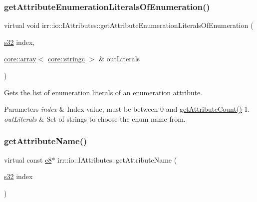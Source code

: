 \subsubsection{\texorpdfstring{get\+Attribute\+Enumeration\+Literals\+Of\+Enumeration()}{getAttributeEnumerationLiteralsOfEnumeration()}\hspace{0.1cm}{\footnotesize\ttfamily [2/2]}}
{\footnotesize\ttfamily virtual void irr\+::io\+::\+I\+Attributes\+::get\+Attribute\+Enumeration\+Literals\+Of\+Enumeration (\begin{DoxyParamCaption}\item[{\hyperlink{namespaceirr_ac66849b7a6ed16e30ebede579f9b47c6}{s32}}]{index,  }\item[{\hyperlink{classirr_1_1core_1_1array}{core\+::array}$<$ \hyperlink{namespaceirr_1_1core_ade1071a878633f2f6d8a75c5d11fec19}{core\+::stringc} $>$ \&}]{out\+Literals }\end{DoxyParamCaption})\hspace{0.3cm}{\ttfamily [pure virtual]}}



Gets the list of enumeration literals of an enumeration attribute. 


\begin{DoxyParams}{Parameters}
{\em index} & Index value, must be between 0 and \hyperlink{classirr_1_1io_1_1IAttributes_a796bdd9440ee7ba0b6742a90a82870b6}{get\+Attribute\+Count()}-\/1. \\
\hline
{\em out\+Literals} & Set of strings to choose the enum name from. \\
\hline
\end{DoxyParams}
\mbox{\label{classirr_1_1io_1_1IAttributes_adee33f518d95a1ca17146bb055c6e5f3}} 
\subsubsection{\texorpdfstring{get\+Attribute\+Name()}{getAttributeName()}}
{\footnotesize\ttfamily virtual const \hyperlink{namespaceirr_a9395eaea339bcb546b319e9c96bf7410}{c8}$\ast$ irr\+::io\+::\+I\+Attributes\+::get\+Attribute\+Name (\begin{DoxyParamCaption}\item[{\hyperlink{namespaceirr_ac66849b7a6ed16e30ebede579f9b47c6}{s32}}]{index }\end{DoxyParamCaption})\hspace{0.3cm}{\ttfamily [pure virtual]}}



